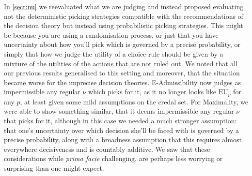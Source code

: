 \documentclass[a4paper]{article}
\newcommand\EU{\mathrm{EU}}
\renewcommand{\color}[1]{}
\newenvironment{CCM rewritten}
{\begingroup\color{blue}} %
{\endgroup}              %
\begin{document}

In \cref{sect:nu} we reevaluated what we are judging and instead proposed evaluating not the deterministic picking strategies compatible with the recommendations of the decision theory but instead using probabilistic picking strategies. This might be because you are using a randomisation process, or just that you have uncertainty about how you'll pick which is governed by a precise probability, or simply that how we judge the utility of a choice rule should be given by a mixture of the utilities of the actions that are not ruled out. 
We noted that all our previous results generalised to this setting and moreover, that the situation became worse for the imprecise decision theories. E-Admissibility now judges as impermissible any regular $\nu$ which picks for it, as it no longer looks like $\EU_p$ for any $p$, at least given some mild assumptions on the credal set. 
For Maximality, we were able to show something similar, that it deems impermissible any regular $\nu$ that picks for it, although in this case we needed a much stronger assumption: that one's uncertainty over which decision she'll be faced with is governed by a precise probability, along with a broadness assumption that this requires almost everywhere decisiveness and is countably additive. {\color{blue} We saw that these considerations while \textit{prima facie} challenging, are perhaps less worrying or surprising than one might expect.}
\end{document}
